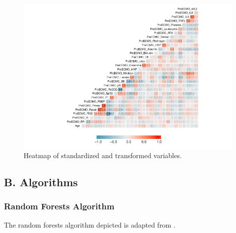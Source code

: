 \documentclass[12pt,]{article}
\begin{document}
\begin{figure}[H]

{\centering \includegraphics[width=1\linewidth]{figure/graphics-unnamed-chunk-11-1} 

}

\caption{\label{fig:heatmap-standardized}Heatmap of standardized and transformed variables.}\label{fig:unnamed-chunk-11}
\end{figure}

\subsection{B. Algorithms}\label{b.-algorithms}

\subsubsection{Random Forests Algorithm}\label{random-forests-algorithm}

The random forests algorithm depicted is adapted from
\citep{hastie_elements_2009}.
\end{document}
